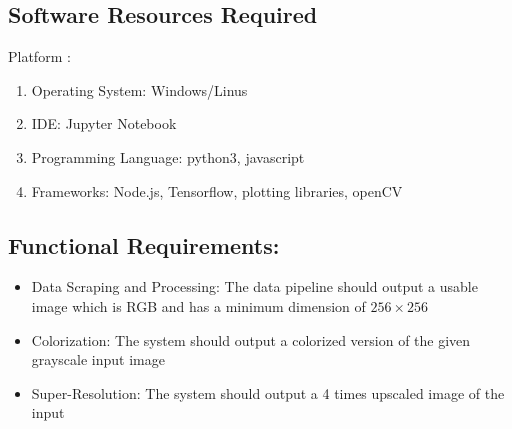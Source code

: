 \documentclass[oneside,a4paper,12pt]{report}
\begin{document}


\pagebreak

\subsection{Software Resources Required}
Platform :
\begin{enumerate}
\item Operating System: Windows/Linus
\item IDE: Jupyter Notebook
\item Programming Language: python3, javascript
\item Frameworks: Node.js, Tensorflow, plotting libraries, openCV
\end{enumerate}

\subsection{Functional Requirements:}
\begin{itemize}
	\item Data Scraping and Processing: The data pipeline should output a usable image which is RGB and has a minimum dimension of $256 \times 256$
	\item Colorization: The system should output a colorized version of the given grayscale input image
	\item Super-Resolution: The system should output a 4 times upscaled image of the input
\end{itemize}
\end{document}
